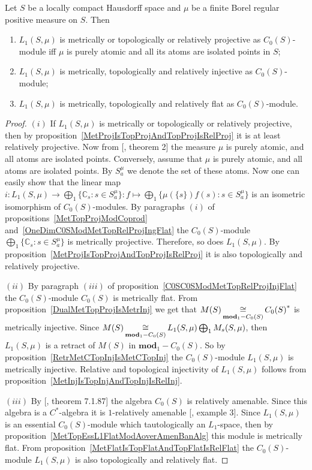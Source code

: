 \begin{proposition}\label{L1C0SModMetTopRelProjInjFlat} Let $S$ be a locally
compact Hausdorff space and $\mu$ be a finite Borel regular positive measure on
$S$. Then 

\begin{enumerate}[label = (\roman*)]
    \item $L_1(S,\mu)$ is metrically or topologically or relatively projective 
    as $C_0(S)$-module iff $\mu$ is purely atomic and all its atoms are 
    isolated points in $S$;

    \item $L_1(S,\mu)$ is metrically, topologically and relatively injective as
    $C_0(S)$-module;

    \item $L_1(S,\mu)$ is metrically, topologically and relatively flat as
    $C_0(S)$-module.
\end{enumerate}
\end{proposition}
\begin{proof} $(i)$ If $L_1(S,\mu)$ is metrically or topologically or relatively
projective, then by proposition~\ref{MetProjIsTopProjAndTopProjIsRelProj} it is
at least relatively projective. Now from [\cite{NemRelProjModLp}, theorem 2] 
the measure $\mu$ is purely atomic, and all atoms are isolated  points.
Conversely, assume that $\mu$ is purely atomic, and all atoms are isolated
points. By $S_a^{\mu}$ we denote the set of these atoms. Now one can easily show
that the linear map 
$i:L_1(S,\mu)\to\bigoplus_1 \{\mathbb{C}_s:s\in S_a^{\mu} \}
:f\mapsto \bigoplus_1 \{\mu( \{s \})f(s):s\in S_a^{\mu} \}$ is an isometric
isomorphism of $C_0(S)$-modules. By paragraphs $(i)$ of
propositions~\ref{MetTopProjModCoprod}
and~\ref{OneDimC0SModMetTopRelProjIngFlat} the $C_0(S)$-module $\bigoplus_1
\{\mathbb{C}_s:s\in S_a^{\mu} \}$ is metrically projective. Therefore, so does
$L_1(S,\mu)$. By proposition~\ref{MetProjIsTopProjAndTopProjIsRelProj} it is
also topologically and relatively projective.

$(ii)$ By paragraph $(iii)$ of proposition~\ref{C0SC0SModMetTopRelProjInjFlat} 
the $C_0(S)$-module $C_0(S)$ is metrically flat. From
proposition~\ref{DualMetTopProjIsMetrInj} we get that
$M(S)\mathop{\mathbin{\cong}}\limits_{\mathbf{mod}_1-C_0(S)}{C_0(S)}^*$ is metrically injective. Since
$M(S)\mathop{\mathbin{\cong}}\limits_{\mathbf{mod}_1-C_0(S)}L_1(S,\mu)\bigoplus_1 M_s(S,\mu)$, then
$L_1(S,\mu)$ is a retract of $M(S)$ in $\mathbf{mod}_1-C_0(S)$. So by
proposition~\ref{RetrMetCTopInjIsMetCTopInj} the $C_0(S)$-module $L_1(S,\mu)$ is
metrically injective. Relative and topological injectivity of $L_1(S,\mu)$
follows from proposition~\ref{MetInjIsTopInjAndTopInjIsRelInj}.

$(iii)$ By [\cite{HelBanLocConvAlg}, theorem 7.1.87] the algebra $C_0(S)$ is
relatively amenable. Since this algebra is a $C^*$-algebra it is $1$-relatively 
amenable [\cite{RundeAmenConstFour}, example 3]. Since $L_1(S,\mu)$ is 
an essential $C_0(S)$-module which tautologically an $L_1$-space, then by
proposition~\ref{MetTopEssL1FlatModAoverAmenBanAlg} this module is metrically
flat. From proposition~\ref{MetFlatIsTopFlatAndTopFlatIsRelFlat} the
$C_0(S)$-module $L_1(S,\mu)$ is also topologically and relatively flat.
\end{proof}

